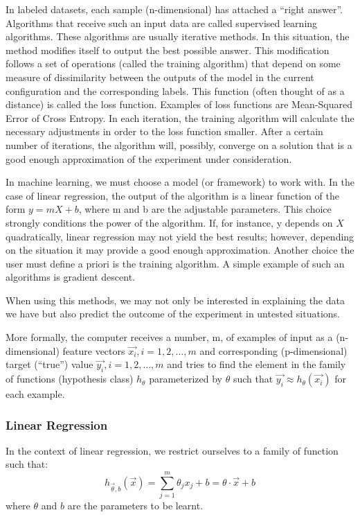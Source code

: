 \documentclass{article}
\begin{document}
In labeled datasets, each sample (n-dimensional) has attached a “right answer”. Algorithms that receive such an input data are called supervised learning algorithms. These algorithms are usually iterative methods. In this situation, the method modifies itself to output the best possible answer. This modification follows a set of operations (called the training algorithm) that depend on some measure of dissimilarity between the outputs of the model in the current configuration and the corresponding labels. This function (often thought of as a distance) is called the loss function. Examples of loss functions are Mean-Squared Error of Cross Entropy. In each iteration, the training algorithm will calculate the necessary adjustments in order to the loss function smaller. After a certain number of iterations, the algorithm will, possibly, converge on a solution that is a good enough approximation of the experiment under consideration.

In machine learning, we must choose a model (or framework) to work with. In the case of linear regression, the output of the algorithm is a linear function of the form $y = mX + b$, where m and b are the adjustable parameters. This choice strongly conditions the power of the algorithm. If, for instance, y depends on $X$ quadratically, linear regression may not yield the best results; however, depending on the situation it may provide a good enough approximation.
Another choice the user must define a priori is the training algorithm. A simple example of such an algorithms is gradient descent. 

When using this methods, we may not only be interested in explaining the data we have but also predict the outcome of the experiment in untested situations. 


More formally, the computer receives a number, m, of examples of input as a (n-dimensional) feature vectors $\vec{x_i}, i = 1,2, \ldots ,m$ and corresponding (p-dimensional) target (“true”) value $\vec{ y_i}, i=1,2, \ldots ,m$ and tries to find the element in the family of functions (hypothesis class) $h_{\theta}$ parameterized by $\theta$ such that $\vec{ y_i}  \approx h_\theta \left(\vec {x_i} \right)$ for each example. 

\subsubsection{Linear Regression}
\label{subsubsec:linear-regression}
In the context of linear regression, we restrict ourselves to a family of function such that:
\begin{equation}
h_{\vec{\theta},b} ( \vec{x} ) = \sum_{j = 1}^{m} \theta_j x_j + b = \theta \cdot \vec{x} + b
\end{equation}
where $\theta$ and $b$ are the parameters to be learnt.
\end{document}
